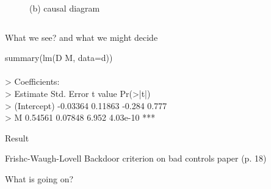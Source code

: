 \begin{frame}
\begin{columns}
\begin{column}{0.5\textwidth}
\begin{figure}
				\caption*{(b) causal diagram}
			\end{figure}
		\end{column}
	\end{columns}
\end{frame}
%
%
\begin{lhframe}[rhgraphic={\texttt{[image: spurious.pdf]}}]
	{What we see?}
	{and what we might decide}
	
	
	\begin{codesnippet}[\textwidth]
		summary(lm(D \command{~} M, data=d)) \\ \\
		> Coefficients: \\
		> Estimate Std. Error t value Pr(>|t|) \\
		> (Intercept) -0.03364    0.11863  -0.284    0.777 \\
		> M            0.54561    0.07848   6.952 4.03e-10 *** \\ 
	\end{codesnippet}
\end{lhframe}
%
%
\begin{frame}[t]
	{Result}
	
	Frishc-Waugh-Lovell
	Backdoor criterion on bad controls paper (p. 18)
\end{frame}
%
%
\begin{frame}[t]
	{What is going on?}
\end{frame}
%
%
